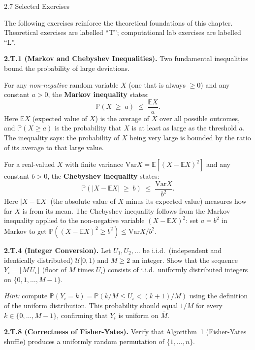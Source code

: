 \documentclass[aspectratio=169,10pt]{beamer}
\begin{document}
\begin{frame}[allowframebreaks]{2.7 Selected Exercises}

The following exercises reinforce the theoretical foundations of this chapter.
Theoretical exercises are labelled ``T''; computational lab exercises are
labelled ``L''.

\medskip
\textbf{2.T.1 (Markov and Chebyshev Inequalities).}
Two fundamental inequalities bound the probability of large deviations.

For any \emph{non-negative} random variable $X$ (one that is always $\ge 0$)
and any constant $a > 0$, the \textbf{Markov inequality} states:
\[
  \mathbb{P}(X \;\ge\; a) \;\le\; \frac{\mathbb{E}X}{a}.
\]
Here $\mathbb{E}X$ (expected value of $X$) is the average of $X$ over all
possible outcomes, and $\mathbb{P}(X \ge a)$ is the probability that $X$
is at least as large as the threshold $a$.  The inequality says: the
probability of $X$ being very large is bounded by the ratio of its average
to that large value.

For a real-valued $X$ with finite variance $\mathrm{Var}X = \mathbb{E}[(X-\mathbb{E}X)^2]$
and any constant $b > 0$, the \textbf{Chebyshev inequality} states:
\[
  \mathbb{P}(|X - \mathbb{E}X| \;\ge\; b)
  \;\le\; \frac{\mathrm{Var}X}{b^2}.
\]
Here $|X - \mathbb{E}X|$ (the absolute value of $X$ minus its expected
value) measures how far $X$ is from its mean.  The Chebyshev inequality
follows from the Markov inequality applied to the non-negative variable
$(X - \mathbb{E}X)^2$: set $a = b^2$ in Markov to get
$\mathbb{P}((X - \mathbb{E}X)^2 \ge b^2) \le \mathrm{Var}X / b^2$.

\medskip
\textbf{2.T.4 (Integer Conversion).}
Let $U_1, U_2, \ldots$ be i.i.d.\ (independent and identically distributed)
$\mathcal{U}[0,1)$ and $M \ge 2$ an integer.  Show that the sequence
$Y_i = \lfloor M\,U_i \rfloor$ (floor of $M$ times $U_i$) consists of
i.i.d.\ uniformly distributed integers on $\{0, 1, \ldots, M-1\}$.

\emph{Hint:} compute $\mathbb{P}(Y_i = k) = \mathbb{P}(k/M \le U_i < (k+1)/M)$
using the definition of the uniform distribution.  This probability should
equal $1/M$ for every $k \in \{0, \ldots, M-1\}$, confirming that $Y_i$
is uniform on $\bar{M}$.

\framebreak

\textbf{2.T.8 (Correctness of Fisher-Yates).}
Verify that Algorithm~1 (Fisher-Yates shuffle) produces a uniformly random
permutation of $\{1, \ldots, n\}$.


\end{frame}
\end{document}

